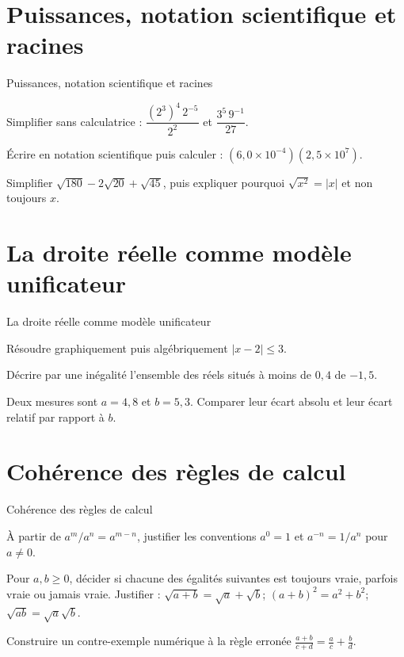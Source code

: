 \section{Puissances, notation scientifique et racines}
\label{workbook:section:01.04}
\begin{exerciseblock}{Puissances, notation scientifique et racines}
\item Simplifier sans calculatrice : $\dfrac{(2^3)^4\,2^{-5}}{2^2}$ et $\dfrac{3^5\,9^{-1}}{27}$.
\item Écrire en notation scientifique puis calculer : $(6{,}0\times10^{-4})(2{,}5\times10^7)$.
\item Simplifier $\sqrt{180}-2\sqrt{20}+\sqrt{45}$, puis expliquer pourquoi $\sqrt{x^2}=|x|$ et non toujours $x$.
\end{exerciseblock}
\section{La droite réelle comme modèle unificateur}
\label{workbook:section:01.05}
\begin{exerciseblock}{La droite réelle comme modèle unificateur}
\item Résoudre graphiquement puis algébriquement $|x-2|\leq 3$.
\item Décrire par une inégalité l'ensemble des réels situés à moins de $0{,}4$ de $-1{,}5$.
\item Deux mesures sont $a=4{,}8$ et $b=5{,}3$. Comparer leur écart absolu et leur écart relatif par rapport à $b$.
\end{exerciseblock}
\section{Cohérence des règles de calcul}
\label{workbook:section:01.06}
\begin{exerciseblock}{Cohérence des règles de calcul}
\item À partir de $a^m/a^n=a^{m-n}$, justifier les conventions $a^0=1$ et $a^{-n}=1/a^n$ pour $a\neq0$.
\item Pour $a,b\ge0$, décider si chacune des égalités suivantes est toujours vraie, parfois vraie ou jamais vraie. Justifier : $\sqrt{a+b}=\sqrt a+\sqrt b$; $(a+b)^2=a^2+b^2$; $\sqrt{ab}=\sqrt a\sqrt b$.
\item Construire un contre-exemple numérique à la règle erronée $\frac{a+b}{c+d}=\frac ac+\frac bd$.
\end{exerciseblock}
